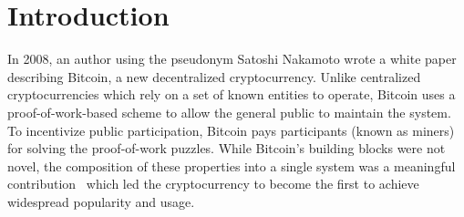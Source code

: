 
\section{Introduction}

In 2008, an author using the pseudonym Satoshi Nakamoto wrote a white paper describing Bitcoin, a new decentralized cryptocurrency.%
Unlike centralized cryptocurrencies which rely on a set of known entities to operate, Bitcoin uses a proof-of-work-based scheme to allow the general public to maintain the system.%
To incentivize public participation, Bitcoin pays participants (known as miners) for solving the proof-of-work puzzles.
While Bitcoin's building blocks were not novel, the composition of these properties into a single system was a meaningful contribution~\cite{Narayanan17} which led the cryptocurrency to become the first to achieve widespread popularity and usage.

